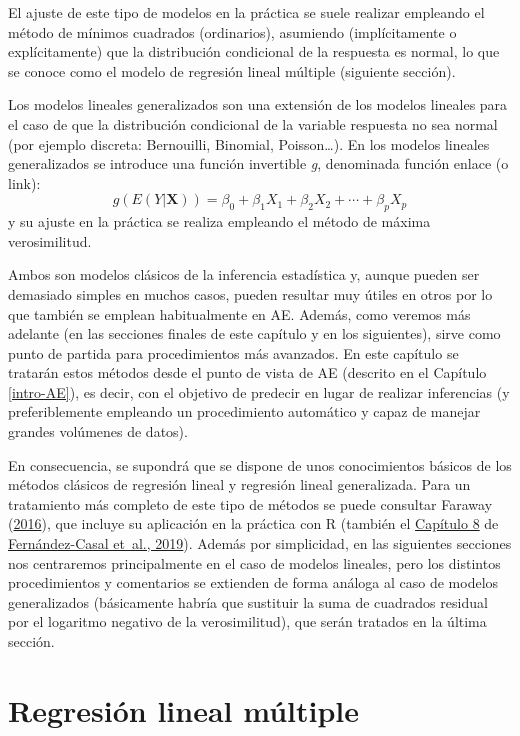 \documentclass[
]{book}
\theoremstyle{break}
\theoremstyle{nonumberplain}
\begin{document}
El ajuste de este tipo de modelos en la práctica se suele realizar empleando el método de mínimos cuadrados (ordinarios), asumiendo (implícitamente o explícitamente) que la distribución condicional de la respuesta es normal, lo que se conoce como el modelo de regresión lineal múltiple (siguiente sección).

Los modelos lineales generalizados son una extensión de los modelos lineales para el caso de que la distribución condicional de la variable respuesta no sea normal (por ejemplo discreta: Bernouilli, Binomial, Poisson\ldots).
En los modelos lineales generalizados se introduce una función invertible \emph{g}, denominada función enlace (o link):
\[g\left(E(Y | \mathbf{X} )\right) = \beta_{0}+\beta_{1}X_{1}+\beta_{2}X_{2}+\cdots+\beta_{p}X_{p}\]
y su ajuste en la práctica se realiza empleando el método de máxima verosimilitud.

Ambos son modelos clásicos de la inferencia estadística y, aunque pueden ser demasiado simples en muchos casos, pueden resultar muy útiles en otros por lo que también se emplean habitualmente en AE.
Además, como veremos más adelante (en las secciones finales de este capítulo y en los siguientes), sirve como punto de partida para procedimientos más avanzados.
En este capítulo se tratarán estos métodos desde el punto de vista de AE (descrito en el Capítulo \ref{intro-AE}), es decir, con el objetivo de predecir en lugar de realizar inferencias (y preferiblemente empleando un procedimiento automático y capaz de manejar grandes volúmenes de datos).

En consecuencia, se supondrá que se dispone de unos conocimientos básicos de los métodos clásicos de regresión lineal y regresión lineal generalizada.
Para un tratamiento más completo de este tipo de métodos se puede consultar Faraway (\protect\hyperlink{ref-faraway2014linear}{2016}), que incluye su aplicación en la práctica con R (también el \href{https://rubenfcasal.github.io/intror/modelos-lineales.html}{Capítulo 8} de \protect\hyperlink{ref-fernandez2019intror}{Fernández-Casal et~al., 2019}).
Además por simplicidad, en las siguientes secciones nos centraremos principalmente en el caso de modelos lineales, pero los distintos procedimientos y comentarios se extienden de forma análoga al caso de modelos generalizados (básicamente habría que sustituir la suma de cuadrados residual por el logaritmo negativo de la verosimilitud), que serán tratados en la última sección.

\hypertarget{reg-multiple}{%
\section{Regresión lineal múltiple}\label{reg-multiple}}
\end{document}
